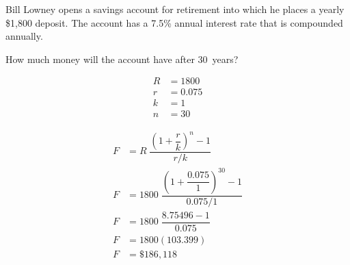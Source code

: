 \documentclass[12pt,letterpaper]{exam}
\begin{document}
\begin{questions}
 
 
 
  

 \newpage
 \question[10] Bill Lowney opens a savings account for retirement into which he places a yearly  \$1,800 deposit. The account has a 7.5\% annual interest rate that is compounded annually. 
        \begin{parts}
        \item How much money will the account have after 30~years? \pvspace{1.4cm}

{\itshape
\begin{minipage}[c]{0.45\textwidth}
	\[
	\begin{aligned}
	R&= 1800 \\
	r&= 0.075 \\
	k&= 1 \\
	n&= 30 
	\end{aligned}
	\]
\end{minipage}%
\begin{minipage}[b]{0.45\textwidth}
	\[
	\begin{aligned}
	F&= R\; \dfrac{\left(1 + \dfrac{r}{k} \right)^n - 1}{r/k} \\[0.3cm]
	F&= 1800\; \dfrac{\left(1 + \dfrac{0.075}{1} \right)^{30} - 1}{0.075/1} \\[0.3cm]
	F&= 1800\; \dfrac{8.75496 - 1}{0.075} \\[0.3cm]
	F&= 1800(103.399) \\[0.3cm]
	F&= \$186,118
	\end{aligned}
	\]
\end{minipage}
} \pvspace{1.4cm}


\end{parts}
\end{questions}
\end{document}
